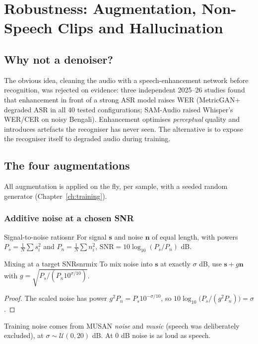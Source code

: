 \chapter{Robustness: Augmentation, Non-Speech Clips and Hallucination}
\label{ch:robust}

\section{Why not a denoiser?}

The obvious idea, cleaning the audio with a speech-enhancement network before recognition, was rejected on evidence: three
independent 2025--26 studies found that enhancement in front of a strong ASR model raises WER (MetricGAN+ degraded ASR in all 40
tested configurations; SAM-Audio raised Whisper's WER/CER on noisy Bengali). Enhancement optimises \emph{perceptual} quality and
introduces artefacts the recogniser has never seen. The alternative is to expose the recogniser itself to degraded audio during
training.

\section{The four augmentations}

All augmentation is applied on the fly, per sample, with a seeded random generator (Chapter~\ref{ch:training}).

\subsection{Additive noise at a chosen SNR}

\begin{definition}{Signal-to-noise ratio}{snr}
For signal $\bm s$ and noise $\bm n$ of equal length, with powers $P_s=\frac1N\sum s_i^2$ and $P_n=\frac1N\sum n_i^2$,
$\mathrm{SNR}=10\log_{10}(P_s/P_n)$ dB.
\end{definition}

\begin{proposition}{Mixing at a target SNR}{snrmix}
To mix noise into $\bm s$ at exactly $\sigma$ dB, use $\bm s+g\bm n$ with $g=\sqrt{P_s/(P_n10^{\sigma/10})}$.
\end{proposition}
\begin{proof}
The scaled noise has power $g^2P_n=P_s10^{-\sigma/10}$, so $10\log_{10}\big(P_s/(g^2P_n)\big)=\sigma$.
\end{proof}

Training noise comes from MUSAN \emph{noise} and \emph{music} (speech was deliberately excluded), at $\sigma\sim\mathcal U(0,20)$ dB.
At 0 dB noise is as loud as speech.

